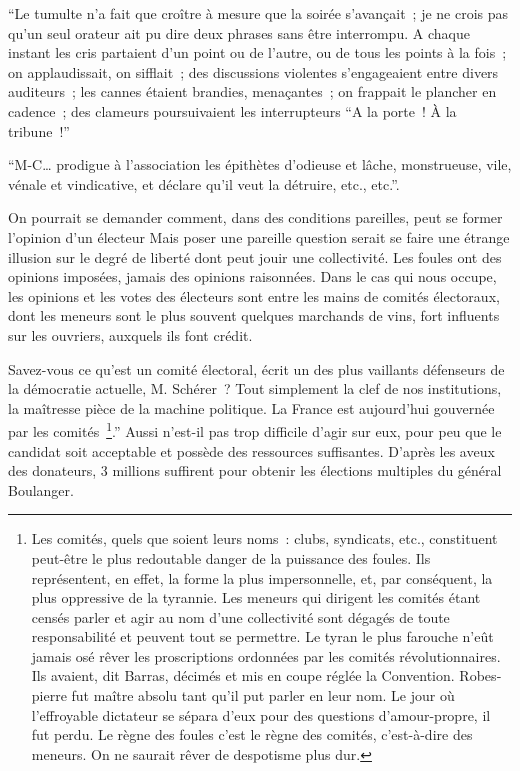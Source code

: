 \documentclass[french,twoside]{book} %
\begin{document}
“Le tumulte n’a fait que croître à mesure que la soirée s’avançait ; je ne crois pas qu’un seul orateur ait pu dire deux phrases sans être interrompu. A chaque instant les cris partaient d’un point ou de l’autre, ou de tous les points à la fois ; on applaudissait, on sifflait ; des discussions violentes s’engageaient entre divers auditeurs ; les cannes étaient brandies, menaçantes ; on frappait le plan­cher en cadence ; des clameurs poursuivaient les interrupteurs “A la porte ! À la tribune !”\par
“M-C… prodigue à l’association les épithètes d’odieuse et lâche, monstrueuse, vile, vénale et vindicative, et déclare qu’il veut la détruire, etc., etc.”.\par
On pourrait se demander comment, dans des conditions pareilles, peut se former l’opinion d’un électeur Mais poser une pareille question serait se faire une étrange illusion sur le degré de liberté dont peut jouir une collectivité. Les foules ont des opinions imposées, jamais des opinions raisonnées. Dans le cas qui nous occupe, les opinions et les votes des électeurs sont entre les mains de comités électoraux, dont les meneurs sont le plus souvent quelques marchands de vins, fort influents sur les ouvriers, auxquels ils font crédit.\par
Savez-vous ce qu’est un comité électoral, écrit un des plus vaillants défenseurs de la démocratie actuelle, M. Schérer ? Tout simplement la clef de nos institutions, la maîtresse pièce de la machine politique. La France est aujourd’hui gouvernée par les comités \footnote{Les comités, quels que soient leurs noms : clubs, syndicats, etc., constituent peut-être le plus redoutable danger de la puissance des foules. Ils représentent, en effet, la forme la plus imper­sonnelle, et, par conséquent, la plus oppressive de la tyrannie. Les meneurs qui dirigent les comités étant censés parler et agir au nom d’une collectivité sont dégagés de toute responsabilité et peuvent tout se permettre. Le tyran le plus farouche n’eût jamais osé rêver les proscriptions ordonnées par les comités révolutionnaires. Ils avaient, dit Barras, décimés et mis en coupe réglée la Convention. Robes­pierre fut maître absolu tant qu’il put parler en leur nom. Le jour où l’effroyable dictateur se sépara d’eux pour des questions d’amour-propre, il fut perdu. Le règne des foules c’est le règne des comités, c’est-à-dire des meneurs. On ne saurait rêver de despotisme plus dur.}.” Aussi n’est-il pas trop difficile d’agir sur eux, pour peu que le candidat soit acceptable et possède des ressources suffisantes. D’après les aveux des donateurs, 3 millions suffirent pour obtenir les élections multiples du général Boulanger.\par
\end{document}
